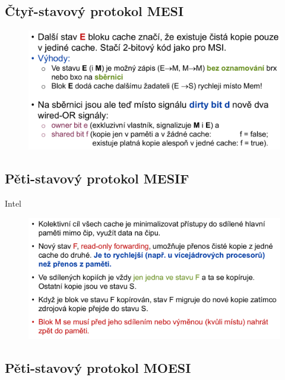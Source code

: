 \subsection{Čtyř-stavový protokol MESI}

\begin{figure}[H]
    \centering
    \includegraphics[width=0.9\linewidth]{mesi.pdf}
\end{figure}

\subsection{Pěti-stavový protokol MESIF}

\begin{compactitem}
    \item Intel
    \begin{figure}[H]
        \centering
        \includegraphics[width=0.9\linewidth]{mesif.pdf}
    \end{figure}
\end{compactitem}

\subsection{Pěti-stavový protokol MOESI}

